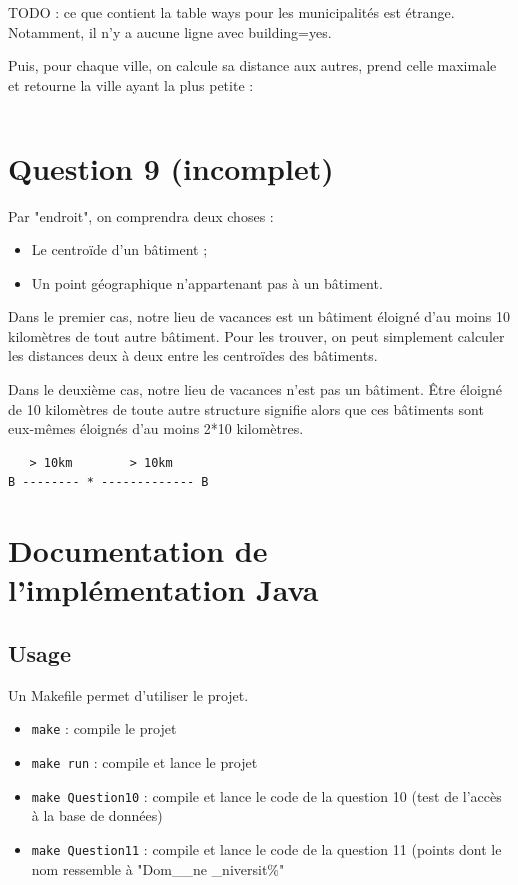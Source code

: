 \documentclass[12pt,a4paper]{article}
\begin{document}
TODO : ce que contient la table ways pour les municipalités est étrange. Notamment,
il n'y a aucune ligne avec building=yes.

Puis, pour chaque ville, on calcule sa distance aux autres, prend celle maximale
et retourne la ville ayant la plus petite :

\begin{lstlisting}[language=SQL]
\end{lstlisting}

\vspace{1cm}
\section*{Question 9 (incomplet)}

Par "endroit", on comprendra deux choses :

\begin{itemize}
	\item Le centroïde d'un bâtiment ;
	\item Un point géographique n'appartenant pas à un bâtiment.
\end{itemize}

Dans le premier cas, notre lieu de vacances est un bâtiment éloigné d'au moins
10 kilomètres de tout autre bâtiment. Pour les trouver, on peut simplement
calculer les distances deux à deux entre les centroïdes des bâtiments.

Dans le deuxième cas, notre lieu de vacances n'est pas un bâtiment. Être éloigné
de 10 kilomètres de toute autre structure signifie alors que ces bâtiments sont
eux-mêmes éloignés d'au moins 2*10 kilomètres.

\begin{lstlisting}
   > 10km        > 10km
B -------- * ------------- B
\end{lstlisting}

\vspace{1cm}
\section*{Documentation de l'implémentation Java}

\subsection*{Usage}

Un Makefile permet d'utiliser le projet. 
\begin{itemize}
	\item \verb?make? : compile le projet
    \item \verb?make run? : compile et lance le projet
    \item \verb?make Question10? : compile et lance le code de la question 10 (test de l'accès à la base de données)
    \item \verb?make Question11? : compile et lance le code de la question 11 (points dont le nom ressemble à "Dom\_\_ne \_niversit\%"
\end{itemize}
\end{document}
